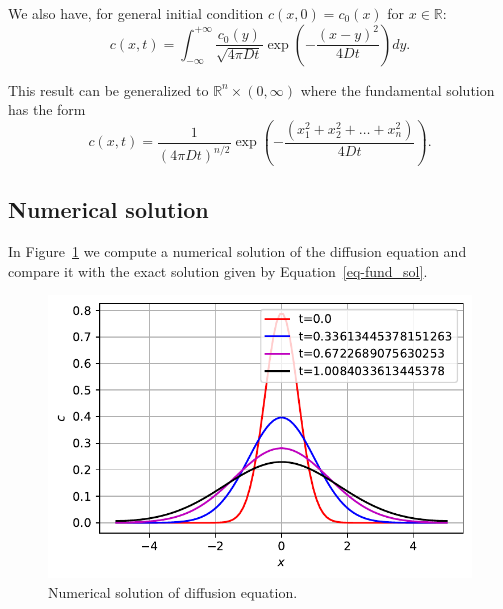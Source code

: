 \documentclass[
  letterpaper,
  DIV=11,
  numbers=noendperiod]{scrreprt}
\theoremstyle{definition}
\theoremstyle{plain}
\theoremstyle{plain}
\theoremstyle{remark}
\begin{document}
We also have, for general initial condition \(c(x, 0) = c_0(x)\) for
\(x\in \mathbb R\): \[
c(x, t) = \int_{-\infty}^{+\infty} \frac{c_0(y)}{\sqrt{4 \pi D t}} \exp \left( - \frac{ (x-y)^2}{ 4Dt} \right) dy.
\]

This result can be generalized to \(\mathbb R^n\times (0,\infty)\) where
the fundamental solution has the form \[
c(x,t) =  \frac 1{(4 \pi D t)^{n/2}} \exp \left( - \frac{ (x_{1}^{2} + x_{2}^{2} + \ldots + x_{n}^{2})}{ 4Dt} \right).
\]

\hypertarget{numerical-solution}{%
\subsection{Numerical solution}\label{numerical-solution}}

In Figure~\ref{fig-diffusionpde} we compute a numerical solution of the
diffusion equation and compare it with the exact solution given by
Equation~\ref{eq-fund_sol}.

\begin{figure}

{\centering \includegraphics{linearreactiondiffusion_files/figure-pdf/fig-diffusionpde-output-1.pdf}

}

\caption{\label{fig-diffusionpde}Numerical solution of diffusion
equation.}

\end{figure}
\end{document}
